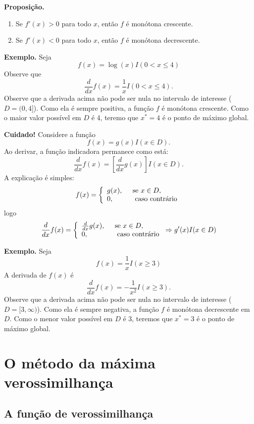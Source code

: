 \documentclass[
  letterpaper,
  DIV=11,
  numbers=noendperiod]{scrartcl}
\providecommand{\tightlist}{%
  \setlength{\itemsep}{0pt}\setlength{\parskip}{0pt}}\usepackage{longtable,booktabs,array}
\begin{document}
\textbf{Proposição.}

\begin{enumerate}
\def\labelenumi{\arabic{enumi}.}
\tightlist
\item
  Se \(f'(x)>0\) para todo \(x\), então \(f\) é monótona crescente.
\item
  Se \(f'(x)<0\) para todo \(x\), então \(f\) é monótona decrescente.
\end{enumerate}

\textbf{Exemplo.} Seja \[f(x)=\log(x)I(0<x\leq 4)\] Observe que
\[\frac{d}{dx}f(x)=\frac{1}{x}I(0<x\leq 4).\] Observe que a derivada
acima não pode ser nula no intervalo de interesse (\(D=(0,4]\)). Como
ela é sempre positiva, a função \(f\) é monótona crescente. Como o maior
valor possível em \(D\) é 4, teremo que \(x^*=4\) é o ponto de máximo
global.

\textbf{Cuidado!} Considere a função \[f(x)=g(x)I(x\in D).\] Ao derivar,
a função indicadora permanece como está:
\[\frac{d}{dx}f(x)=\left[\frac{d}{dx}g(x)\right]I(x\in D).\] A
explicação é simples:
\[f(x)=\left\{\begin{array}{ll}g(x),&\;\;\hbox{se }x\in D,\\0,&\;\;\hbox{ caso contrário}\end{array}\right.\]
logo
\[\frac{d}{dx}f(x)=\left\{\begin{array}{ll}\frac{d}{dx}g(x),&\;\;\hbox{se }x\in D,\\0,&\;\;\hbox{ caso contrário}\end{array}\right.\Rightarrow g'(x)I(x\in D)\]

\textbf{Exemplo.} Seja \[f(x)=\frac{1}{x}I(x\geq 3)\] A derivada de
\(f(x)\) é \[\frac{d}{dx}f(x)=-\frac{1}{x^2}I(x\geq 3).\] Observe que a
derivada acima não pode ser nula no intervalo de interesse
(\(D=[3,\infty)\)). Como ela é sempre negativa, a função \(f\) é
monótona decrescente em \(D\). Como o menor valor possível em \(D\) é 3,
teremos que \(x^*=3\) é o ponto de máximo global.

\section{O método da máxima
verossimilhança}\label{o-muxe9todo-da-muxe1xima-verossimilhanuxe7a}

\subsection{A função de
verossimilhança}\label{a-funuxe7uxe3o-de-verossimilhanuxe7a}
\end{document}
